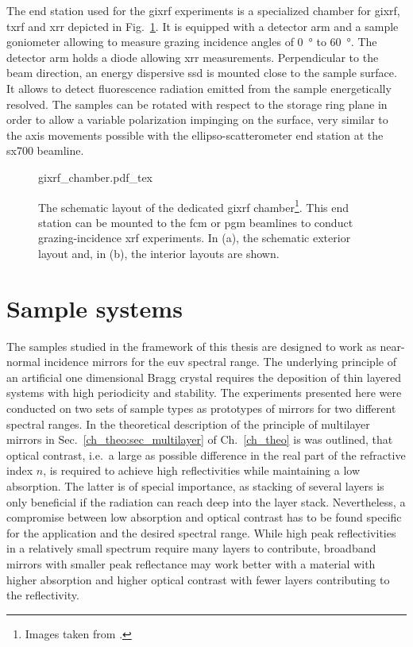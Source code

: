 The end station used for the \gls{gixrf} experiments is a specialized chamber for \gls{gixrf}, \gls{txrf} and \gls{xrr} \cite{lubeck_novel_2013} depicted in Fig.~\ref{ch_exp:fig_gixrf_chamber}. It is equipped with a detector arm and a sample goniometer allowing to measure grazing incidence angles of \SI{0}{\degree} to \SI{60}{\degree}. The detector arm holds a diode allowing \gls{xrr} measurements. Perpendicular to the beam direction, an energy dispersive \gls{ssd} is mounted close to the sample surface. It allows to detect fluorescence radiation emitted from the sample energetically resolved. The samples can be rotated with respect to the storage ring plane in order to allow a variable polarization impinging on the surface, very similar to the axis movements possible with the ellipso-scatterometer end station at the \gls{sx700} beamline.



\begin{figure}[htb]
    \def\svgwidth{\textwidth}
    {gixrf_chamber.pdf_tex}
    \caption[The GIXRF chamber.]{The schematic layout of the dedicated \gls{gixrf} chamber\footnote{Images taken from \textcite{lubeck_novel_2013}.}. This end station can be mounted to the \gls{fcm} or \gls{pgm} beamlines to conduct grazing-incidence \gls{xrf} experiments. In (a), the schematic exterior layout and, in (b), the interior layouts are shown.}
    \label{ch_exp:fig_gixrf_chamber}
\end{figure}

\section{Sample systems}
The samples studied in the framework of this thesis are designed to work as near-normal incidence mirrors for the \gls{euv} spectral range. The underlying principle of an artificial one dimensional Bragg crystal requires the deposition of thin layered systems with high periodicity and stability. The experiments presented here were conducted on two sets of sample types as prototypes of mirrors for two different spectral ranges. In the theoretical description of the principle of multilayer mirrors in Sec.~\ref{ch_theo:sec_multilayer} of Ch.~\ref{ch_theo} is was outlined, that optical contrast, i.e.~a large as possible difference in the real part of the refractive index $n$, is required to achieve high reflectivities while maintaining a low absorption. The latter is of special importance, as stacking of several layers is only beneficial if the radiation can reach deep into the layer stack. Nevertheless, a compromise between low absorption and optical contrast has to be found specific for the application and the desired spectral range. While high peak reflectivities in a relatively small spectrum require many layers to contribute, broadband mirrors with smaller peak reflectance may work better with a material with higher absorption and higher optical contrast with fewer layers contributing to the reflectivity.


